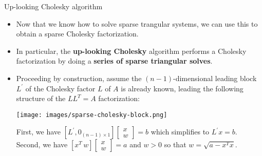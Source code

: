 \documentclass[t,usepdftitle=false]{beamer}
\begin{document}
\begin{frame}{Up-looking Cholesky algorithm}
\begin{itemize}
\item Now that we know how to solve sparse trangular systems, we can use this to obtain a sparse Cholesky factorization.
\item In particular, the \textbf{up-looking Cholesky} algorithm performs a Cholesky factorization by doing a \textbf{series of sparse triangular solves}.
\item Proceeding by construction, assume the $(n-1)$-dimensional leading block $L^\prime$ of the Cholesky factor $L$ of $A$ is already known, leading the following structure of the $LL^T=A$ factorization:
\vspace{.1cm}
\begin{center}
\texttt{[image: images/sparse-cholesky-block.png]}
\end{center}
First, we have $[L^\prime,0_{(n-1)\times 1}]\begin{bmatrix}x\\w\end{bmatrix}=b$ which simplifies to $L^\prime x=b$.\vspace{.1cm}\\
Second, we have $[x^T\,w]\begin{bmatrix}x\\w\end{bmatrix}=a$ and $w>0$ so that $w=\sqrt{a-x^Tx}$.
\end{itemize}
\end{frame}
\end{document}
